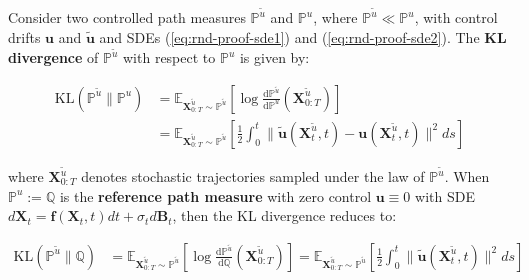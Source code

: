 \documentclass{article}
\begin{document}
\begin{corollary}\label{corollary:kl-divergence-ito}
    Consider two controlled path measures $\mathbb{P}^{\tilde{u}}$ and $\mathbb{P}^u$, where $\mathbb{P}^{\tilde{u}}\ll\mathbb{P}^u$, with control drifts $\boldsymbol{u}$ and $\tilde{\boldsymbol{u}}$ and SDEs (\ref{eq:rnd-proof-sde1}) and (\ref{eq:rnd-proof-sde2}). The \textbf{KL divergence} of $\mathbb{P}^{\tilde{u}}$ with respect to $\mathbb{P}^u$ is given by:
    \begin{small}
    \begin{align}
        \text{KL}(\mathbb{P}^{\tilde{u}}\|\mathbb{P}^u)&=\mathbb{E}_{\boldsymbol{X}^{\tilde{u}}_{0:T}\sim\mathbb{P}^{\tilde{u}}}\left[\log \frac{\mathrm{d}\mathbb{P}^{\tilde{u}}}{\mathrm{d}\mathbb{P}^u}(\boldsymbol{X}^{\tilde{u}}_{0:T})\right]\nonumber\\
        &=\mathbb{E}_{\boldsymbol{X}^{\tilde{u}}_{0:T}\sim\mathbb{P}^{\tilde{u}}}\left[\frac{1}{2}\int_0^t\|\tilde{\boldsymbol{u}}(\boldsymbol{X}^{\tilde{u}}_t,t)-\boldsymbol{u}(\boldsymbol{X}^{\tilde{u}}_t,t)\|^2ds\right]\tag{Path KL Divergence}\label{eq:path-kl-divergence}
    \end{align}
    \end{small}
    where $\boldsymbol{X}_{0:T}^{\tilde{u}}$ denotes stochastic trajectories sampled under the law of $\mathbb{P}^{\tilde{u}}$. When $\mathbb{P}^u:=\mathbb{Q}$ is the \textbf{reference path measure} with zero control $\boldsymbol{u}\equiv 0$ with SDE $d\boldsymbol{X}_t=\boldsymbol{f}(\boldsymbol{X}_t,t)dt+\sigma_td\boldsymbol{B}_t$, then the KL divergence reduces to:
    \begin{small}
    \begin{align}
        \text{KL}(\mathbb{P}^{\tilde{u}}\|\mathbb{Q})&=\mathbb{E}_{\boldsymbol{X}^{\tilde{u}}_{0:T}\sim\mathbb{P}^{\tilde{u}}}\left[\log \frac{\mathrm{d}\mathbb{P}^{\tilde{u}}}{\mathrm{d}\mathbb{Q}}(\boldsymbol{X}^{\tilde{u}}_{0:T})\right]=\mathbb{E}_{\boldsymbol{X}^{\tilde{u}}_{0:T}\sim\mathbb{P}^{\tilde{u}}}\left[\frac{1}{2}\int_0^t\|\tilde{\boldsymbol{u}}(\boldsymbol{X}^{\tilde{u}}_t,t)\|^2ds\right]
    \end{align}
    \end{small}
\end{corollary}
\end{document}
